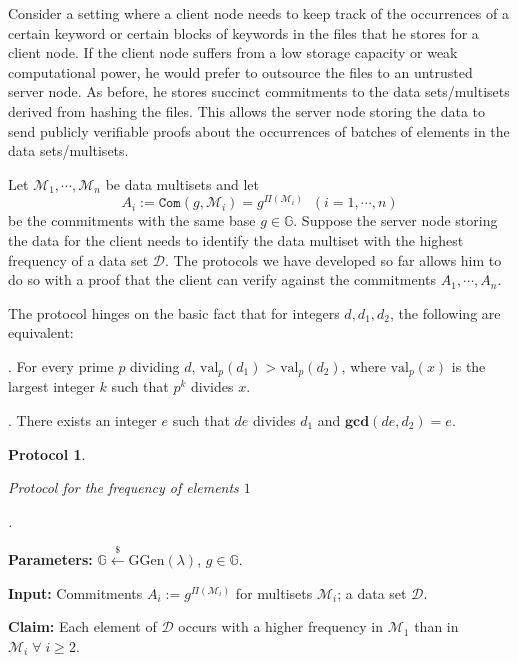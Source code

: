 \documentclass[11pt, lettersize, notitlepage, leqno, footskip=0.6cm]{article}
\newcommand{\ttt}{\texttt}
\newcommand{\bG}{\mathbb{G}}
\newcommand{\mc}{\mathcal}
\newcommand{\mb}{\mathbb}
\newcommand{\mbf}{\mathbf}
\newcommand{\mr}{\mathrm}
\newcommand{\lamb}{\lambda}
\newcommand{\vs}{\vspace{-0.15cm}}
\newcommand{\noin}{\noindent}
\newcommand{\GCD}{\mbf{gcd}}
\newtheorem{Prot}[Thm]{Protocol}
\numberwithin{equation}{section}
\begin{document}
Consider a setting where a client node needs to keep track of the occurrences of a certain keyword or certain blocks of keywords in the files that he stores for a client node. If the client node suffers from a low storage capacity or weak computational power, he would prefer to outsource the files to an untrusted server node. As before, he stores succinct commitments to the data sets/multisets derived from hashing the files. This allows the server node storing the data to send publicly verifiable proofs about the occurrences of batches of elements in the data sets/multisets.

Let $\mc{M}_1,\cdots, \mc{M}_n$ be data multisets and let \vs $$A_i:= \ttt{Com}(g,\mc{M}_i) = g^{\Pi(\mc{M}_i)}\;\;(i=1,\cdots,n) $$ be the commitments with the same base $g\in \bG$. Suppose the server node storing the data for the client needs to identify the data multiset with the highest frequency of a data set $\mc{D}$. The protocols we have developed so far allows him to do so with a proof that the client can verify against the commitments $A_1,\cdots,A_n$.

The protocol hinges on the basic fact that for integers $d,d_1,d_2$, the following are equivalent:

\noin 1. For every prime $p$ dividing $d$, $\mr{val}_p(d_1) > \mr{val}_p(d_2)$, where $\mr{val}_p(x)$ is the largest integer $k$ such that $p^k$ divides $x$.

\noin 2. There exists an integer $e$ such that $de$ divides $d_1$ and $\GCD(de, d_2) = e$.

\vspace{0.1cm}

\begin{Prot}\hypertarget{Freq}{Protocol for the frequency of elements $1$}.\end{Prot} \vspace{-0.3cm}

\noin \textbf{Parameters:} $\mb{G}\xleftarrow{\$} \mr{GGen}(\lamb)$,\; $g\in \mb{G}$.

\noin \textbf{Input:} Commitments $A_i := g^{\Pi(\mc{M}_i)}$ for multisets $\mc{M}_i$; a data set $\mc{D}$.

\noin \textbf{Claim:} Each element of $\mc{D}$ occurs with a higher frequency in $\mc{M}_1$ than in $\mc{M}_i\;\forall\;i\geq 2$.\vs
\end{document}
